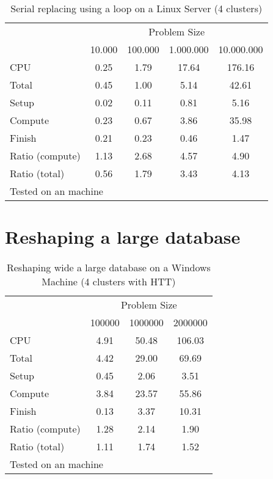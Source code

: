\documentclass[letterpaper, 14pt, titlepage]{article}
\begin{document}
\begin{landscape}
\begin{table}[!h]
\Large
\centering
\caption{\large Serial replacing using a loop on a Linux Server (4 clusters)\label{tab:serialreplace_linux}}
\begin{tabular}{l*{4}{c}}\hline
& \multicolumn{4}{c}{Problem Size} \\
& 10.000 &           100.000 &          1.000.000 &         10.000.000 \\ \hline
CPU &     0.25 &      1.79 &     17.64 &    176.16 \\
Total &     0.45 &      1.00 &      5.14 &     42.61 \\
\hspace{2mm} Setup &     0.02 &      0.11 &      0.81 &      5.16 \\
\hspace{2mm} Compute &     0.23 &      0.67 &      3.86 &     35.98 \\
\hspace{2mm} Finish &     0.21 &      0.23 &      0.46 &      1.47 \\
\hline Ratio (compute) &     1.13 &      2.68 &      4.57 &      4.90 \\
Ratio (total) &     0.56 &      1.79 &      3.43 &      4.13 \\
\hline
\multicolumn{5}{l}{\footnotesize Tested on an \unix1 machine}
\end{tabular}
\end{table}

\pagebreak

\section{\Huge Reshaping a large database}

\begin{table}[!h]
\Large
\centering
\caption{\large Reshaping wide a large database on a Windows Machine (4 clusters with HTT)}
\begin{tabular}{l*{3}{c}}\hline
& \multicolumn{3}{c}{Problem Size} \\
& 100000 &         1000000 &         2000000 \\ \hline
CPU &     4.91 &     50.48 &    106.03 \\
Total &     4.42 &     29.00 &     69.69 \\
\hspace{2mm} Setup &     0.45 &      2.06 &      3.51 \\
\hspace{2mm} Compute &     3.84 &     23.57 &     55.86 \\
\hspace{2mm} Finish &     0.13 &      3.37 &     10.31 \\
\hline Ratio (compute) &     1.28 &      2.14 &      1.90 \\
Ratio (total) &     1.11 &      1.74 &      1.52 \\
\hline
\multicolumn{4}{l}{\footnotesize Tested on an \win1 machine}
\end{tabular}
\end{table}


\end{landscape}
\end{document}
